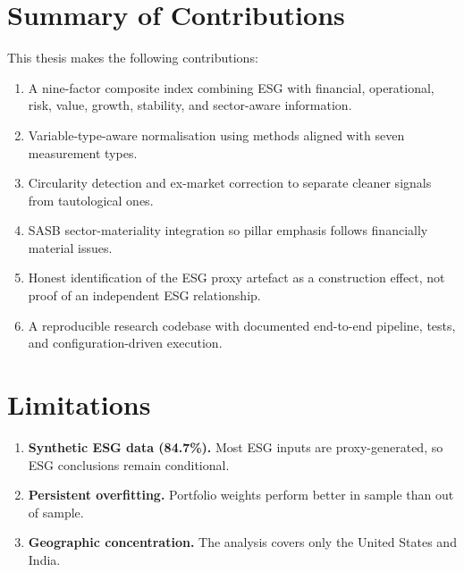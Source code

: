 \section{Summary of Contributions}
\label{sec:contributions}

This thesis makes the following contributions:

\begin{enumerate}
    \item A nine-factor composite index combining ESG with financial, operational, risk, value, growth, stability, and sector-aware information.
    \item Variable-type-aware normalisation using methods aligned with seven measurement types.
    \item Circularity detection and ex-market correction to separate cleaner signals from tautological ones.
    \item SASB sector-materiality integration so pillar emphasis follows financially material issues.
    \item Honest identification of the ESG proxy artefact as a construction effect, not proof of an independent ESG relationship.
    \item A reproducible research codebase with documented end-to-end pipeline, tests, and configuration-driven execution.
\end{enumerate}

\section{Limitations}
\label{sec:limitations}

\begin{enumerate}
    \item \textbf{Synthetic ESG data (84.7\%).} Most ESG inputs are proxy-generated, so ESG conclusions remain conditional.
    \item \textbf{Persistent overfitting.} Portfolio weights perform better in sample than out of sample.
    \item \textbf{Geographic concentration.} The analysis covers only the United States and India.
\end{enumerate}

